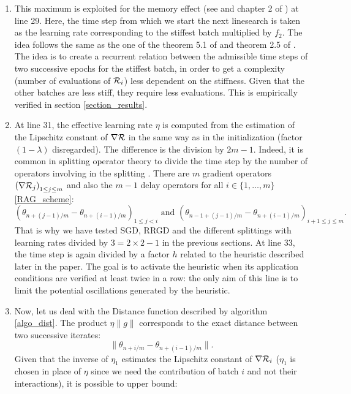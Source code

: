 \begin{enumerate}
	\item This maximum is exploited for the memory effect (see \cite{Lyap_Theory_Bilel,Bilel_ICML} and chapter 2 of \cite{Bilel_thesis}) at line 29. Here, the time step from
          which we start the next linesearch is taken as the learning rate corresponding to the stiffest batch multiplied by $f_2$. The idea follows the same as the one of the
          theorem 5.1 of \cite{Bilel_ICML} and theorem 2.5 of \cite{Bilel_thesis}. The idea is to create a recurrent relation between the admissible time steps of two successive
          epochs for the stiffest batch, in order to get a complexity (number of evaluations of $\mathcal{R}_i$) less dependent on the stiffness. Given that the other batches are less
          stiff, they require less evaluations. This is empirically verified in section \ref{section_results}.
	\item At line 31, the effective learning rate $\eta$ is computed from the estimation of the Lipschitz constant of $\nabla \mathcal{R}$ in the same way as in the initialization (factor $(1-\lambda)$ disregarded). The difference is the division by $2m-1$. Indeed, it is common in splitting operator theory to divide the time step by the number of operators involving in the splitting \cite{splitting_ode_review}. There are $m$ gradient operators $\left(\nabla \mathcal{R}_j\right)_{1 \leq j \leq m}$ and also the $m-1$ delay operators for all $i \in \{1,\dots,m\}$ \eqref{RAG_scheme}:
	\begin{equation*}
		\left(\theta_{n+(j-1)/m}-\theta_{n+(i-1)/m}\right)_{1\leq j <i} \text{ and } \left(\theta_{n-1+(j-1)/m}-\theta_{n+(i-1)/m}\right)_{i+1\leq j \leq m}.
	\end{equation*}
	That is why we have tested SGD, RRGD and the different splittings with learning rates divided by $3=2\times 2-1$ in the previous sections. At line 33, the time step is again divided by a factor $h$ related to the heuristic described later in the paper. The goal is to activate the heuristic when its application conditions are verified at least twice in a row: the only aim of this line is to limit the potential oscillations generated by the heuristic.
	\item Now, let us deal with the Distance function described by algorithm \ref{algo_dist}. The product $\eta \|g\|$ corresponds to the exact distance between two successive iterates:
	\begin{equation*}
		\|\theta_{n+i/m}-\theta_{n+(i-1)/m}\|.
	\end{equation*}
	Given that the inverse of $\eta_1$ estimates the Lipschitz constant of $\nabla \mathcal{R}_i$ ($\eta_1$ is chosen in place of $\eta$ since we need the contribution of batch $i$ and not their interactions), it is possible to upper bound:

\end{enumerate}
